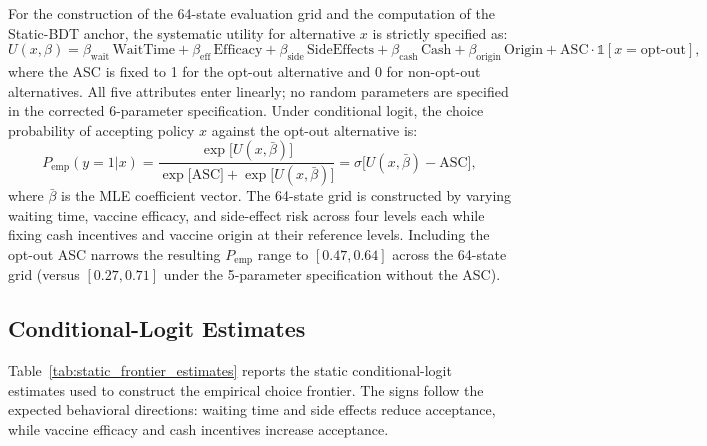 \documentclass[11pt]{article}
\begin{document}
For the construction of the 64-state evaluation grid and the computation of the Static-BDT anchor, the systematic utility for alternative $x$ is strictly specified as:
\[
U(x, \beta) = \beta_{\text{wait}}\,\text{WaitTime} + \beta_{\text{eff}}\,\text{Efficacy} + \beta_{\text{side}}\,\text{SideEffects} + \beta_{\text{cash}}\,\text{Cash} + \beta_{\text{origin}}\,\text{Origin} + \text{ASC}\cdot\mathbb{1}[x = \text{opt-out}],
\]
where the ASC is fixed to 1 for the opt-out alternative and 0 for non-opt-out alternatives. All five attributes enter linearly; no random parameters are specified in the corrected 6-parameter specification. Under conditional logit, the choice probability of accepting policy $x$ against the opt-out alternative is:
\[
P_{\mathrm{emp}}(y=1|x) = \frac{\exp\bigl[U(x, \bar\beta)\bigr]}{\exp\bigl[\mathrm{ASC}\bigr] + \exp\bigl[U(x, \bar\beta)\bigr]} = \sigma\bigl[U(x, \bar\beta) - \mathrm{ASC}\bigr],
\]
where $\bar\beta$ is the MLE coefficient vector. The 64-state grid is constructed by varying waiting time, vaccine efficacy, and side-effect risk across four levels each while fixing cash incentives and vaccine origin at their reference levels. Including the opt-out ASC narrows the resulting $P_{\mathrm{emp}}$ range to $[0.47, 0.64]$ across the 64-state grid (versus $[0.27, 0.71]$ under the 5-parameter specification without the ASC).

\subsection{Conditional-Logit Estimates}

Table~\ref{tab:static_frontier_estimates} reports the static conditional-logit estimates used to construct the empirical choice frontier. The signs follow the expected behavioral directions: waiting time and side effects reduce acceptance, while vaccine efficacy and cash incentives increase acceptance.
\end{document}
